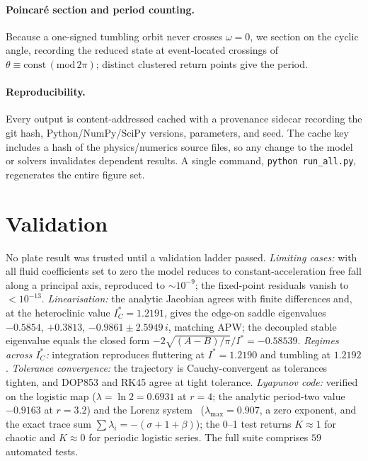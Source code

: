 \documentclass[11pt]{article}
\newcommand{\Is}{I^{*}}          %
\newcommand{\lmax}{\lambda_{\max}}
\begin{document}
\paragraph{Poincar\'e section and period counting.} Because a one-signed tumbling orbit never crosses
$\omega=0$, we section on the cyclic angle, recording the reduced state at event-located crossings of
$\theta\equiv\text{const}\,(\mathrm{mod}\,2\pi)$; distinct clustered return points give the period.

\paragraph{Reproducibility.} Every output is content-addressed cached with a provenance sidecar
recording the git hash, Python/NumPy/SciPy versions, parameters, and seed. The cache key includes a
hash of the physics/numerics source files, so any change to the model or solvers invalidates dependent
results. A single command, \texttt{python run\_all.py}, regenerates the entire figure set.

\section{Validation}\label{sec:validation}

No plate result was trusted until a validation ladder passed. \emph{Limiting cases:} with all fluid
coefficients set to zero the model reduces to constant-acceleration free fall along a principal axis,
reproduced to $\sim10^{-9}$; the fixed-point residuals vanish to $<10^{-13}$. \emph{Linearisation:}
the analytic Jacobian agrees with finite differences and, at the heteroclinic value $\Is_C=1.2191$,
gives the edge-on saddle eigenvalues $-0.5854$, $+0.3813$, $-0.9861\pm2.5949\,i$, matching APW; the
decoupled stable eigenvalue equals the closed form $-2\sqrt{(A-B)/\pi}/\Is=-0.58539$.
\emph{Regimes across $\Is_C$:} integration reproduces fluttering at $\Is=1.2190$ and tumbling at
$1.2192$. \emph{Tolerance convergence:} the trajectory is Cauchy-convergent as tolerances tighten, and
DOP853 and RK45 agree at tight tolerance. \emph{Lyapunov code:} verified on the logistic map
($\lambda=\ln2=0.6931$ at $r=4$; the analytic period-two value $-0.9163$ at $r=3.2$) and the Lorenz
system~\cite{lorenz63} ($\lmax=0.907$, a zero exponent, and the exact trace sum
$\sum\lambda_i=-(\sigma+1+\beta)$); the 0--1 test returns $K\approx1$ for chaotic and $K\approx0$ for
periodic logistic series. The full suite comprises $59$ automated tests.
\end{document}
